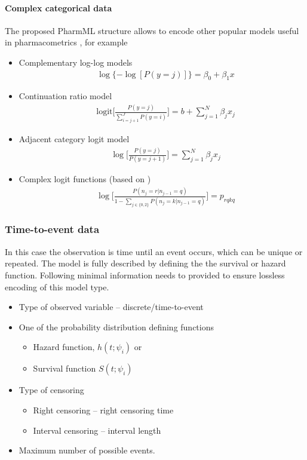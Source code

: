\paragraph{Complex categorical data} The proposed PharmML structure allows to encode 
other popular models useful in pharmacometrics \cite{Dobson:2002uq}, for example
\begin{itemize}
\item
Complementary log-log models
\begin{align}
& \log\{-\log[P(y=j)]\} = \beta_0 + \beta_1 x \nonumber
\end{align}
\item
Continuation ratio model
\begin{align}
& \text{logit}\Big[\frac{P(y=j) }{ \sum_{i =j+1}^{J} P(y=i) } \Big] = b + \sum_{j = 1}^{N} \beta_j x_j \nonumber
\end{align}
\item
Adjacent category logit model
\begin{align}
& \log\Big[\frac{P(y=j) }{ P(y=j+1) } \Big] = \sum_{j = 1}^{N} \beta_j x_j \nonumber
\end{align}
\item
Complex logit functions (based on \cite{Girard:1998fk})
\begin{align}
& \log \Big[\frac{P(n_j=r | n_{j-1}=q) }{ 1 - \sum_{j\in \{0,2\}} P(n_j=k | n_{j-1} = q)} \Big] = p_{rqkq} \nonumber
\end{align}
\end{itemize}


\subsubsection{Time-to-event data}
In this case the observation is time until an event occurs, which can be unique or repeated.
The model is fully described by defining the the survival or hazard function. Following minimal information 
needs to provided to ensure lossless encoding of this model type.
\begin{itemize}
\item
Type of observed variable -- discrete/time-to-event
\item
One of the probability distribution defining functions
\begin{itemize}
\item
Hazard function, $h(t; \psi_i)$ or
\item
Survival function $S(t;\psi_i)$
\end{itemize}
\item
Type of censoring
\begin{itemize}
\item
Right censoring -- right censoring time 
\item
Interval censoring -- interval length
\end{itemize}
\item
Maximum number of possible events.
\end{itemize}


